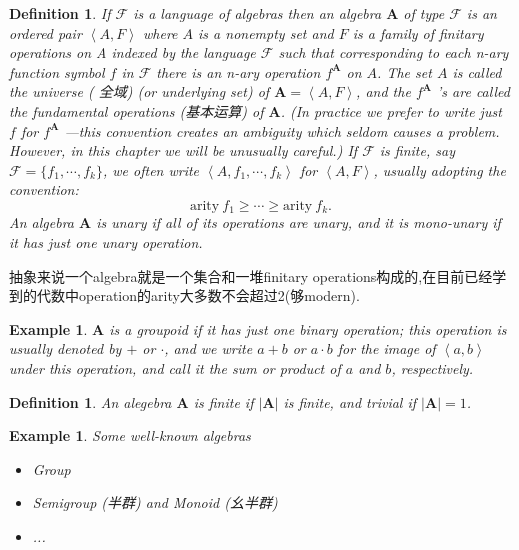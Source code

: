 \documentclass{article}
\newtheorem{example}[theorem]{Example}
\newtheorem{definition}[theorem]{Definition}
\begin{document}
\begin{definition}
\rm If $\mathcal{F}$ is a language of algebras then an {\color{red} algebra} $\mathbf{A}$ of type $\mathcal{F}$ is an ordered pair $\left<A,F\right>$ where $A$ is a {\color{red} nonempty set} and $F$ is a family of {\color{red} finitary operations} on A indexed by the language $\mathcal{F}$ such that corresponding to each n-ary function symbol $f$ in $\mathcal{F}$ there is an n-ary operation $f^\mathbf{A}$ on $A$. The set $A$ is called the {\color{red} universe} ({\color{blue} 全域}) (or underlying set) of $\mathbf{A} =\left<A,F\right>$, and the $f^\mathbf{A}$ ’s are called the {\color{red} fundamental operations} ({\color{blue}基本运算}) of $\mathbf{A}$. (In practice we prefer to write just $f$ for $f ^\mathbf{A}$ —this convention creates an ambiguity which seldom causes a problem. However, in this chapter we will be unusually careful.) If $\mathcal{F}$ is finite, say $\mathcal{F} = \{f_1,\cdots,f_k\}$, we often write $\left<A, f_1,\cdots,f_k\right>$ for $\left<A,F\right>$, usually adopting the convention:
$$
\text{arity}~f_1 \geq \cdots \geq \text{arity}~f_k.
$$
An algebra $\mathbf{A}$ is {\color{red} unary} if all of its operations are unary, and it is mono-unary if it has just one unary operation.
\end{definition}

{\color{blue} 抽象来说一个algebra就是一个集合和一堆finitary operations构成的,在目前已经学到的代数中operation的arity大多数不会超过2(够modern).}

\begin{example}
\rm $\mathbf{A}$ is a {\color{red} groupoid} if it has just one binary operation; this operation is usually denoted by $+$ or $\cdot$, and we write $a+b$ or $a \cdot b$ for the image of $\left<a,b\right>$ under this operation, and call it the sum or product of $a$ and $b$, respectively.
\end{example}

\begin{definition}
\rm An alegebra $\mathbf{A}$ is {\color{red} finite} if $|\mathbf{A}|$ is finite, and trivial if $|\mathbf{A}|=1$. 
\end{definition}

\begin{example}
\rm Some well-known algebras
\begin{itemize}
	\item Group
	\item Semigroup (半群) and Monoid (幺半群)
	\item ...
\end{itemize}
\end{example}
\end{document}
